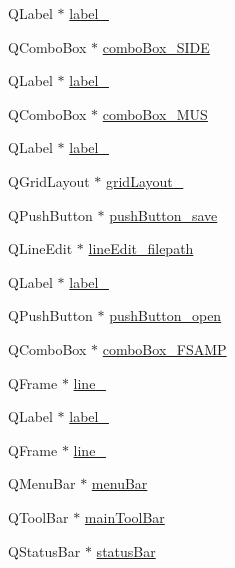 \begin{DoxyCompactItemize}
\item 
Q\+Label $\ast$ \hyperlink{class_ui___main_window_aa2621565827195e88436fb54220bb48d}{label\+\_}
\item 
Q\+Combo\+Box $\ast$ \hyperlink{class_ui___main_window_a35b1e7da83de7512c86d48f2d9f15b05}{combo\+Box\+\_\+\+S\+I\+DE}
\item 
Q\+Label $\ast$ \hyperlink{class_ui___main_window_a1f4ff90c122fededcc08604401442034}{label\+\_}
\item 
Q\+Combo\+Box $\ast$ \hyperlink{class_ui___main_window_a6e4c09cd05089b1bd6081c4431be98e9}{combo\+Box\+\_\+\+M\+US}
\item 
Q\+Label $\ast$ \hyperlink{class_ui___main_window_a2e2516d755e4dd53fc905dabddf2738a}{label\+\_}
\item 
Q\+Grid\+Layout $\ast$ \hyperlink{class_ui___main_window_a8731b71c513ff94baf59614807823c5d}{grid\+Layout\+\_}
\item 
Q\+Push\+Button $\ast$ \hyperlink{class_ui___main_window_a257d4df0fe652a526e4fddba93c7a7d8}{push\+Button\+\_\+save}
\item 
Q\+Line\+Edit $\ast$ \hyperlink{class_ui___main_window_ad3416cfca3fcdab703d11bce1823e72e}{line\+Edit\+\_\+filepath}
\item 
Q\+Label $\ast$ \hyperlink{class_ui___main_window_a55100f53189f25cf8a1ee0beb29be642}{label\+\_}
\item 
Q\+Push\+Button $\ast$ \hyperlink{class_ui___main_window_a3caafe0edcf60acd912b378ad151ceba}{push\+Button\+\_\+open}
\item 
Q\+Combo\+Box $\ast$ \hyperlink{class_ui___main_window_aaf7751422702d5df5584a71119ceabbb}{combo\+Box\+\_\+\+F\+S\+A\+MP}
\item 
Q\+Frame $\ast$ \hyperlink{class_ui___main_window_a17207206e55a605ecc14a3534b7e575f}{line\+\_}
\item 
Q\+Label $\ast$ \hyperlink{class_ui___main_window_a0376fd90247280e7c7957cc70628708c}{label\+\_}
\item 
Q\+Frame $\ast$ \hyperlink{class_ui___main_window_a7fd61d9f66189e10dcae1147f0a48e04}{line\+\_}
\item 
Q\+Menu\+Bar $\ast$ \hyperlink{class_ui___main_window_a2be1c24ec9adfca18e1dcc951931457f}{menu\+Bar}
\item 
Q\+Tool\+Bar $\ast$ \hyperlink{class_ui___main_window_a5172877001c8c7b4e0f6de50421867d1}{main\+Tool\+Bar}
\item 
Q\+Status\+Bar $\ast$ \hyperlink{class_ui___main_window_a50fa481337604bcc8bf68de18ab16ecd}{status\+Bar}
\end{DoxyCompactItemize}



